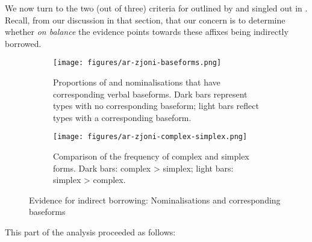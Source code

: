 \documentclass[output=paper]{LSP/langsci}
\begin{document}
We now turn to the two (out of three) criteria for  outlined by \citet{Seifart2015} and singled out in . Recall, from our discussion in that section, that our concern is to determine whether \textit{on balance} the evidence points towards these affixes being indirectly borrowed. 
\largerpage

\begin{figure}[p]
%
\begin{subfigure}[t]{0.7\textwidth}  
	\texttt{[image: figures/ar-zjoni-baseforms.png]}
	\caption{Proportions of {\ar} and {\zjoni} nominalisations that have corresponding verbal baseforms. Dark bars represent types with no corresponding baseform; light bars reflect types with a corresponding baseform.}
	\label{fig:baseforms}
\end{subfigure}
%
\begin{subfigure}[t]{0.75\textwidth}  
	\texttt{[image: figures/ar-zjoni-complex-simplex.png]}
	\caption{Comparison of the frequency of complex and simplex forms. Dark bars: complex > simplex; light bars: simplex > complex.}
	\label{fig:base-freqs}
\end{subfigure}
%
\caption{Evidence for indirect borrowing: Nominalisations and corresponding baseforms}
\label{fig:ar-zjoni-baseforms}
\end{figure}


This part of the analysis proceeded as follows:
\end{document}
